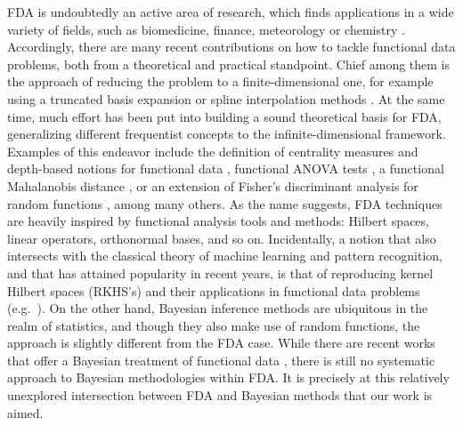\documentclass{article}
\numberwithin{equation}{section}
\theoremstyle{plain}
\theoremstyle{definition}
\begin{document}
FDA is undoubtedly an active area of research, which finds applications in a wide variety of fields, such as biomedicine, finance, meteorology or chemistry \citep{ullah2013applications}. Accordingly, there are many recent contributions on how to tackle functional data problems, both from a theoretical and practical standpoint. Chief among them is the approach of reducing the problem to a finite-dimensional one, for example using a truncated basis expansion or spline interpolation methods \citep{muller2005generalized, aguilera2013comparative}. At the same time, much effort has been put into building a sound theoretical basis for FDA, generalizing different frequentist concepts to the infinite-dimensional framework. Examples of this endeavor include the definition of centrality measures and depth-based notions for functional data \citep{lopez2009concept}, functional ANOVA tests \citep{cuevas2004anova}, a functional Mahalanobis distance \citep{galeano2015mahalanobis, berrendero2020mahalanobis}, or an extension of Fisher's discriminant analysis for random functions \citep{shin2008extension}, among many others. As the name suggests, FDA techniques are heavily inspired by functional analysis tools and methods: Hilbert spaces, linear operators, orthonormal bases, and so on. Incidentally, a notion that also intersects with the classical theory of machine learning and pattern recognition, and that has attained popularity in recent years, is that of reproducing kernel Hilbert spaces (RKHS's) and their applications in functional data problems (e.g.~\citealp{kupresanin2010rkhs, yuan2010reproducing, berrendero2018use}). On the other hand, Bayesian inference methods are ubiquitous in the realm of statistics, and though they also make use of random functions, the approach is slightly different from the FDA case. While there are recent works that offer a Bayesian treatment of functional data \citep[e.g.][]{crainiceanu2010bayesian, shi2011gaussian}, there is still no systematic approach to Bayesian methodologies within FDA. It is precisely at this relatively unexplored intersection between FDA and Bayesian methods that our work is aimed.
\end{document}
